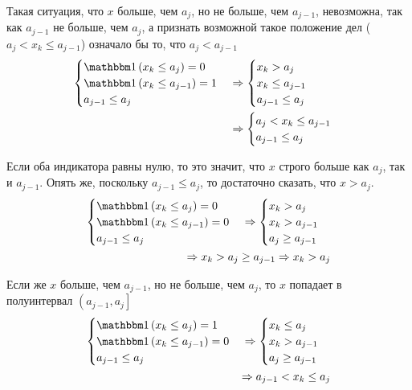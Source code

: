 Такая ситуация,
что $x$ больше, чем $a_j$, но не больше, чем $a_{j-1}$, невозможна,
так как $a_{j-1}$ не больше, чем $a_j$,
а признать возможной такое положение дел ($a_j<x_k\le a_{j-1}$)
означало бы то, что $a_j<a_{j-1}$
\begin{align*}
    \begin{cases}
        \indicator{x_k\le a_j}=0\\
        \indicator{x_k\le a_{j-1}}=1\\
        a_{j-1}\le a_j
    \end{cases}
    &\Rightarrow
    \begin{cases}
        x_k>a_j\\
        x_k\le a_{j-1}\\
        a_{j-1}\le a_j
    \end{cases}
    \\&\Rightarrow
    \begin{cases}
        a_j<x_k\le a_{j-1}\\
        a_{j-1}\le a_j
    \end{cases}
\end{align*}


Если оба индикатора равны нулю,
то это значит, что $x$ строго больше как $a_j$, так и $a_{j-1}$.
Опять же, поскольку $a_{j-1}\le a_j$, то достаточно сказать, что $x>a_j$.
\begin{align*}
    \begin{cases}
        \indicator{x_k\le a_j}=0\\
        \indicator{x_k\le a_{j-1}}=0\\
        a_{j-1}\le a_j
    \end{cases}
    \Rightarrow
    \begin{cases}
        x_k>a_j\\
        x_k>a_{j-1}\\
        a_j\ge a_{j-1}
    \end{cases}
    \\\Rightarrow
        x_k>a_j\ge a_{j-1}
    \Rightarrow
        x_k>a_j
\end{align*}

Если же $x$ больше, чем $a_{j-1}$, но не больше, чем $a_j$,
то $x$ попадает в полуинтервал $\left(a_{j-1},a_j\right]$
\begin{align*}
    \begin{cases}
        \indicator{x_k\le a_j}=1\\
        \indicator{x_k\le a_{j-1}}=0\\
        a_{j-1}\le a_j
    \end{cases}
    \Rightarrow
    \begin{cases}
        x_k\le a_j\\
        x_k>a_{j-1}\\
        a_j\ge a_{j-1}
    \end{cases}
    \\\Rightarrow
        a_{j-1}<x_k\le a_j
\end{align*}

